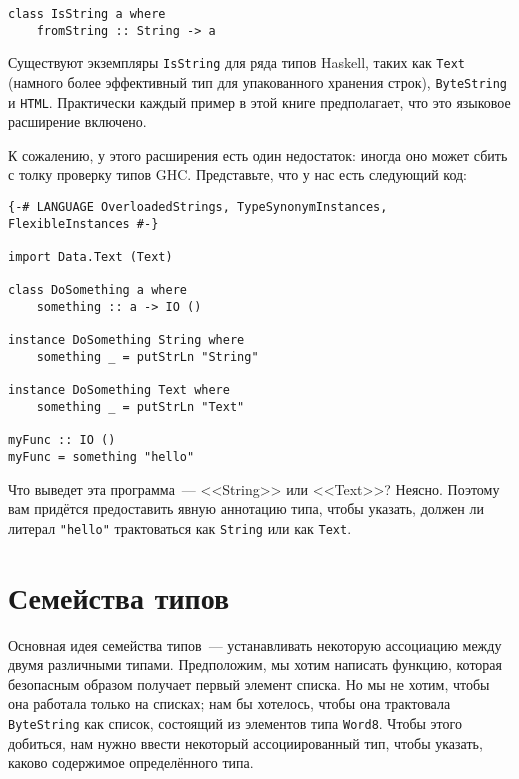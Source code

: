 \begin{lstlisting}
class IsString a where
    fromString :: String -> a
\end{lstlisting}

Существуют экземпляры \lstinline'IsString' для ряда типов Haskell, таких как \lstinline'Text' (намного более эффективный тип для упакованного хранения строк), \lstinline'ByteString' и \lstinline'HTML'. Практически каждый пример в этой книге предполагает, что это языковое расширение включено.

К сожалению, у этого расширения есть один недостаток: иногда оно может сбить с толку проверку типов GHC. Представьте, что у нас есть следующий код:

\begin{lstlisting}
{-# LANGUAGE OverloadedStrings, TypeSynonymInstances, FlexibleInstances #-}

import Data.Text (Text)

class DoSomething a where
    something :: a -> IO ()

instance DoSomething String where
    something _ = putStrLn "String"

instance DoSomething Text where
    something _ = putStrLn "Text"

myFunc :: IO ()
myFunc = something "hello"
\end{lstlisting}

Что выведет эта программа~--- <<String>> или <<Text>>? Неясно. Поэтому вам придётся предоставить явную аннотацию типа, чтобы указать, должен ли литерал \lstinline'"hello"' трактоваться как \lstinline'String' или как \lstinline'Text'.

\section{Семейства типов}

Основная идея семейства типов~--- устанавливать некоторую ассоциацию между двумя различными типами. Предположим, мы хотим написать функцию, которая безопасным образом получает первый элемент списка. Но мы не хотим, чтобы она работала только на списках; нам бы хотелось, чтобы она трактовала \lstinline'ByteString' как список, состоящий из элементов типа \lstinline'Word8'. Чтобы этого добиться, нам нужно ввести некоторый ассоциированный тип, чтобы указать, каково содержимое определённого типа.

